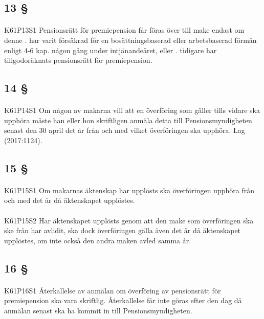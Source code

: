 \documentclass[a4paper,notitlepage,openany,10pt]{book}
\begin{document}
\subsection*{13 §}
\paragraph*{}
{\tiny K61P13S1}
Pensionsrätt för premiepension får föras över till make endast om denne
. har varit försäkrad för en bosättningsbaserad eller arbetsbaserad förmån enligt 4-6 kap. någon gång under intjänandeåret, eller
. tidigare har tillgodoräknats pensionsrätt för premiepension.
\subsection*{14 §}
\paragraph*{}
{\tiny K61P14S1}
Om någon av makarna vill att en överföring som gäller tills vidare ska upphöra måste han eller hon skriftligen anmäla detta till Pensionsmyndigheten senast den 30 april det år från och med vilket överföringen ska upphöra.
Lag (2017:1124).
\subsection*{15 §}
\paragraph*{}
{\tiny K61P15S1}
Om makarnas äktenskap har upplösts ska överföringen upphöra från och med det år då äktenskapet upplöstes.
\paragraph*{}
{\tiny K61P15S2}
Har äktenskapet upplösts genom att den make som överföringen ska ske från har avlidit, ska dock överföringen gälla även det år då äktenskapet upplöstes, om inte också den andra maken avled samma år.
\subsection*{16 §}
\paragraph*{}
{\tiny K61P16S1}
Återkallelse av anmälan om överföring av pensionsrätt för premiepension ska vara skriftlig. Återkallelse får inte göras efter den dag då anmälan senast ska ha kommit in till Pensionsmyndigheten.
\end{document}
